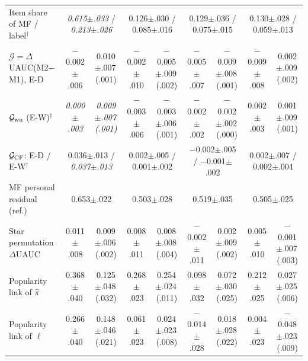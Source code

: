 \begin{table}[tp]
{\begin{tabular}{@{}lcccccccc@{}}
Item share of MF / label$^\dagger$ & \multicolumn{2}{c}{\textit{0.615{\scriptsize$\pm$.033}} / \textit{0.213{\scriptsize$\pm$.026}}} & \multicolumn{2}{c}{0.126{\scriptsize$\pm$.030} / 0.085{\scriptsize$\pm$.016}} & \multicolumn{2}{c}{0.129{\scriptsize$\pm$.036} / 0.075{\scriptsize$\pm$.015}} & \multicolumn{2}{c}{0.130{\scriptsize$\pm$.028} / 0.059{\scriptsize$\pm$.013}}\\
$\mathcal G=\Delta$UAUC(M2$-$M1), E-D & $-$0.002{\scriptsize$\pm$.006} & 0.010{\scriptsize$\pm$.007\,(.001)} & $-$0.002{\scriptsize$\pm$.010} & $-$0.005{\scriptsize$\pm$.009\,(.002)} & $-$0.005{\scriptsize$\pm$.007} & $-$0.009{\scriptsize$\pm$.008\,(.001)} & $-$0.009{\scriptsize$\pm$.008} & 0.002{\scriptsize$\pm$.009\,(.002)}\\
$\mathcal G_{\rm wu}$ (E-W)$^\dagger$ & \textit{0.000{\scriptsize$\pm$.003}} & \textit{0.009{\scriptsize$\pm$.007\,(.001)}} & $-$0.003{\scriptsize$\pm$.006} & $-$0.003{\scriptsize$\pm$.006\,(.001)} & $-$0.002{\scriptsize$\pm$.002} & $-$0.002{\scriptsize$\pm$.002\,(.000)} & 0.002{\scriptsize$\pm$.003} & 0.001{\scriptsize$\pm$.009\,(.001)}\\
$\mathcal G_{\rm CF}$: E-D / E-W$^\dagger$ & \multicolumn{2}{c}{0.036{\scriptsize$\pm$.013} / \textit{0.037{\scriptsize$\pm$.013}}} & \multicolumn{2}{c}{0.002{\scriptsize$\pm$.005} / 0.001{\scriptsize$\pm$.002}} & \multicolumn{2}{c}{$-$0.002{\scriptsize$\pm$.005} / $-$0.001{\scriptsize$\pm$.002}} & \multicolumn{2}{c}{0.002{\scriptsize$\pm$.007} / 0.002{\scriptsize$\pm$.004}}\\
\quad MF personal residual (ref.) & \multicolumn{2}{c}{0.653{\scriptsize$\pm$.022}} & \multicolumn{2}{c}{0.503{\scriptsize$\pm$.028}} & \multicolumn{2}{c}{0.519{\scriptsize$\pm$.035}} & \multicolumn{2}{c}{0.505{\scriptsize$\pm$.025}}\\
Star permutation $\Delta$UAUC & 0.011{\scriptsize$\pm$.008} & 0.009{\scriptsize$\pm$.006\,(.002)} & 0.008{\scriptsize$\pm$.011} & 0.008{\scriptsize$\pm$.008\,(.004)} & $-$0.002{\scriptsize$\pm$.011} & 0.002{\scriptsize$\pm$.009\,(.002)} & 0.005{\scriptsize$\pm$.010} & $-$0.001{\scriptsize$\pm$.007\,(.003)}\\
Popularity link of $\hat\pi$ & 0.368{\scriptsize$\pm$.040} & 0.125{\scriptsize$\pm$.048\,(.032)} & 0.268{\scriptsize$\pm$.023} & 0.254{\scriptsize$\pm$.024\,(.011)} & 0.098{\scriptsize$\pm$.032} & 0.072{\scriptsize$\pm$.030\,(.025)} & 0.212{\scriptsize$\pm$.025} & 0.027{\scriptsize$\pm$.025\,(.006)}\\
Popularity link of $\ell$ & 0.266{\scriptsize$\pm$.040} & 0.148{\scriptsize$\pm$.046\,(.021)} & 0.061{\scriptsize$\pm$.023} & 0.024{\scriptsize$\pm$.023\,(.008)} & $-$0.014{\scriptsize$\pm$.028} & 0.018{\scriptsize$\pm$.028\,(.022)} & 0.004{\scriptsize$\pm$.023} & $-$0.048{\scriptsize$\pm$.023\,(.009)}\\

\end{tabular}}
\end{table}
